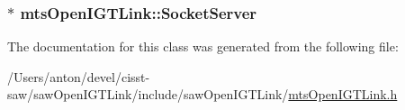 \subsubsection[{Socket\+Server}]{$\ast$ mts\+Open\+I\+G\+T\+Link\+::\+Socket\+Server\hspace{0.3cm}{\ttfamily [protected]}}\label{classmts_open_i_g_t_link_adc1f9d5e4dbc18d71552a41d17940893}


The documentation for this class was generated from the following file\+:\begin{DoxyCompactItemize}
\item 
/\+Users/anton/devel/cisst-\/saw/saw\+Open\+I\+G\+T\+Link/include/saw\+Open\+I\+G\+T\+Link/\hyperlink{mts_open_i_g_t_link_8h}{mts\+Open\+I\+G\+T\+Link.\+h}\end{DoxyCompactItemize}

